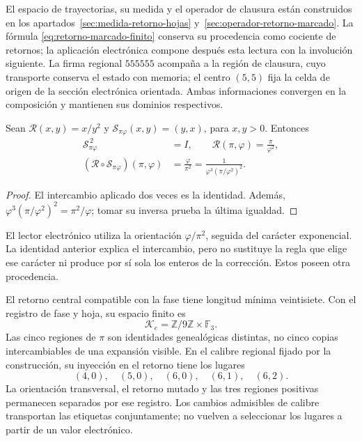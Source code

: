 El espacio de trayectorias, su medida y el operador de clausura están
construidos en los apartados~\ref{sec:medida-retorno-hojas}
y~\ref{sec:operador-retorno-marcado}. La fórmula
\eqref{eq:retorno-marcado-finito} conserva su procedencia como cociente
de retornos; la aplicación electrónica compone después esta lectura
con la involución siguiente. La firma regional \(555555\) acompaña
a la región de clausura, cuyo transporte conserva el estado con memoria;
el centro \((5,5)\) fija la celda de origen de la sección electrónica
orientada. Ambas informaciones convergen en la composición y mantienen
sus dominios respectivos.

\begin{lemma}
Sean \(\mathcal R(x,y)=x/y^2\) y
\(\mathscr S_{\pi\varphi}(x,y)=(y,x)\), para \(x,y>0\).
Entonces
\begin{equation}
 \begin{aligned}
 \mathscr S_{\pi\varphi}^{\,2}&=I,\qquad
 \mathcal R(\pi,\varphi)=\frac{\pi}{\varphi^2},\\
 (\mathcal R\circ\mathscr S_{\pi\varphi})(\pi,\varphi)
 &=\frac{\varphi}{\pi^2}
 =\frac1{\varphi^3(\pi/\varphi^2)^2}.
 \end{aligned}
 \label{eq:el-bisagra}
\end{equation}
\end{lemma}
\begin{proof}
El intercambio aplicado dos veces es la identidad. Además,
\(\varphi^3(\pi/\varphi^2)^2=\pi^2/\varphi\); tomar su inversa prueba
la última igualdad.
\end{proof}

El lector electrónico utiliza la orientación \(\varphi/\pi^2\),
seguida del carácter exponencial. La identidad anterior explica el
intercambio, pero no sustituye la regla que elige ese carácter ni produce
por sí sola los enteros de la corrección. Estos poseen otra procedencia.

El retorno central compatible con la fase tiene longitud mínima
veintisiete. Con el registro de fase y hoja, su espacio finito es
\[
 \mathcal K_e=\mathbb Z/9\mathbb Z\times\mathbb F_3.
\]
Las cinco regiones de \(\pi\) son identidades genealógicas distintas,
no cinco copias intercambiables de una expansión visible. En el calibre
regional fijado por la construcción, su inyección en el retorno tiene
los lugares
\begin{equation}
 (4,0),\quad(5,0),\quad(6,0),\quad(6,1),\quad(6,2).
 \label{eq:el-cinco-lugares}
\end{equation}
La orientación transversal, el retorno mutado y las tres regiones
positivas permanecen separados por ese registro. Los cambios admisibles
de calibre transportan las etiquetas conjuntamente; no vuelven a
seleccionar los lugares a partir de un valor electrónico.

